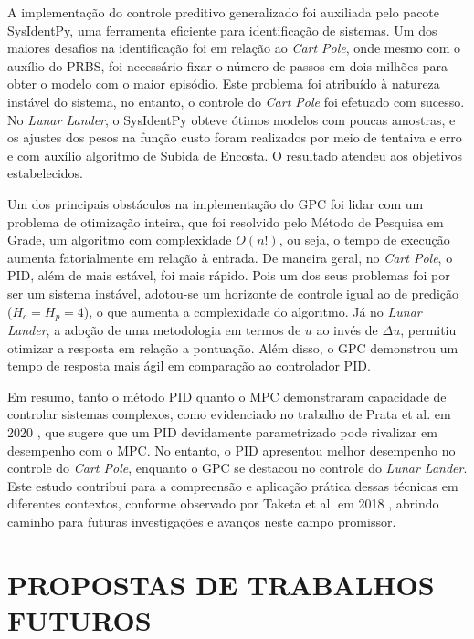 \documentclass[12pt,           %
a4paper,                       %
openany,                       %
oneside,                       %
chapter=TITLE,                 %
english,                       %
spanish,                       %
brazil,                        %
sumario=tradicional]{abntex2}  %
\begin{document}
\begin{OnehalfSpace}
A implementação do controle preditivo generalizado foi auxiliada pelo pacote SysIdentPy, uma ferramenta eficiente para identificação de sistemas. Um dos maiores desafios na identificação foi em relação ao \textit{Cart Pole}, onde mesmo com o auxílio do PRBS, foi necessário fixar o número de passos em dois milhões para obter o modelo com o maior episódio. Este problema foi atribuído à natureza instável do sistema, no entanto, o controle do \textit{Cart Pole} foi efetuado com sucesso. No \textit{Lunar Lander}, o SysIdentPy obteve ótimos modelos com poucas amostras, e os ajustes dos pesos na função custo foram realizados por meio de tentaiva e erro e com auxílio algoritmo de Subida de Encosta. O resultado atendeu aos objetivos estabelecidos.

Um dos principais obstáculos na implementação do GPC foi lidar com um problema de otimização inteira, que foi resolvido pelo Método de Pesquisa em Grade, um algoritmo com complexidade $O(n!)$, ou seja, o tempo de execução aumenta fatorialmente em relação à entrada. De maneira geral, no \textit{Cart Pole}, o PID, além de mais estável, foi mais rápido. Pois um dos seus problemas foi por ser um sistema instável, adotou-se um horizonte de controle igual ao de predição ($H_c=H_p=4$), o que aumenta a complexidade do algoritmo. Já no \textit{Lunar Lander}, a adoção de uma metodologia em termos de $u$ ao invés de $\Delta u$, permitiu otimizar a resposta em relação a pontuação. Além disso, o GPC demonstrou um tempo de resposta mais ágil em comparação ao controlador PID.


Em resumo, tanto o método PID quanto o MPC demonstraram capacidade de controlar sistemas complexos, como evidenciado no trabalho de Prata et al. em 2020 \cite{prata2020}, que sugere que um PID devidamente parametrizado pode rivalizar em desempenho com o MPC. No entanto, o PID apresentou melhor desempenho no controle do \textit{Cart Pole}, enquanto o GPC se destacou no controle do \textit{Lunar Lander}. Este estudo contribui para a compreensão e aplicação prática dessas técnicas em diferentes contextos, conforme observado por Taketa et al. em 2018 \cite{taketa2018}, abrindo caminho para futuras investigações e avanços neste campo promissor.\\


{\let\clearpage\relax\par \chapter{PROPOSTAS DE TRABALHOS FUTUROS}}
\label{ch:propostas}                        %



\end{OnehalfSpace}
\end{document}
